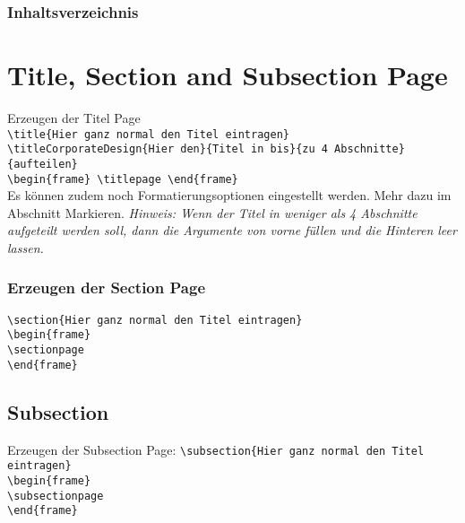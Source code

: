 \documentclass[rgb]{beamer}
\begin{document}
\begin{frame}[t]
	\frametitle{Inhaltsverzeichnis}
	\tableofcontents
\end{frame}


\section{Title, Section and Subsection Page}

\begin{frame}[t]
	\sectionpage
		\textcolor{seeblau100}{Erzeugen der Titel Page}\\
	\vskip 18pt
	\texttt{\textbackslash title\{Hier ganz normal den Titel eintragen\}}\\
	\texttt{\textbackslash titleCorporateDesign\{Hier den\}\{Titel in bis\}\{zu 4 Abschnitte\}\{aufteilen\}}\\
	\vskip 18pt
	\texttt{\textbackslash begin\{frame\} \textbackslash titlepage \textbackslash end\{frame\}}\\
	\vskip 18pt
	Es können zudem noch Formatierungsoptionen eingestellt werden. Mehr dazu im Abschnitt Markieren.
	\vskip 18pt
	\textit{Hinweis: Wenn der Titel in weniger als 4 Abschnitte aufgeteilt werden soll, dann die Argumente von vorne füllen und die Hinteren leer lassen.}
	\vskip 18pt
\end{frame}


\begin{frame}[t]
	\frametitle{Erzeugen der Section Page}
	\vskip 18pt
	\texttt{\textbackslash section\{Hier ganz normal den Titel eintragen\}}\\
	\vskip 18pt
	\texttt{\textbackslash begin\{frame\}}\\
	\texttt{\textbackslash sectionpage }\\
	\texttt{\textbackslash end\{frame\}}\\	\vskip 18pt
\end{frame}

\subsection{Subsection}
\begin{frame}[t]
	\subsectionpage
	Erzeugen der Subsection Page:
	\vskip 18pt
	\texttt{\textbackslash subsection\{Hier ganz normal den Titel eintragen\}}\\
	\vskip 18pt
	\texttt{\textbackslash begin\{frame\}}\\
	\texttt{\textbackslash subsectionpage }\\
	\texttt{\textbackslash end\{frame\}}\\
\end{frame}
\end{document}

